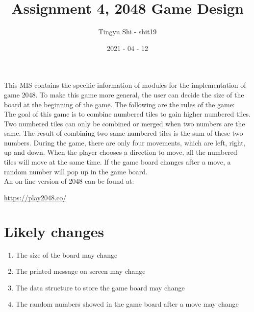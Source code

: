 \documentclass[12pt]{article}
\title{Assignment 4, 2048 Game Design}
\author{Tingyu Shi - shit19}
\date{2021 - 04 - 12}
\begin{document}
\maketitle

This MIS contains the specific information of modules for the 
implementation of game 2048. To make this game more 
general, the user can decide the size of the board at the 
beginning of the game. The following are the rules of the game:\\
The goal of this game is to combine numbered tiles to gain higher
numbered tiles. Two numbered tiles can only be combined or merged
when two numbers are the same. The result of combining two same 
numbered tiles is the sum of these two numbers. During the game,
there are only four movements, which are left, right, up and down.
When the player chooses a direction to move, all the numbered tiles
will move at the same time. If the game board changes after a move,
a random number will pop up in the game board.\\

An on-line version of 2048 can be found at:
\begin{center}
\href {https://play2048.co/} {https://play2048.co/}
\end{center}

\section{Likely changes}
\begin{enumerate}
\item The size of the board may change
\item The printed message on screen may change
\item The data structure to store the game board may change
\item The random numbers showed in the game board after a move may change
\end{enumerate}
\end{document}

